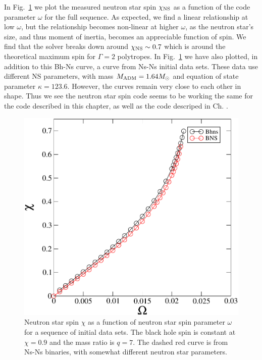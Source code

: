 In Fig.~\ref{fig:ChiVOmega} we plot the
measured neutron star spin $\chi_{\rm NS}$ as a function of the code
parameter $\omega$ for the full sequence. As expected, we find a linear
relationship at low $\omega$, but the relationship becomes non-linear
at higher $\omega$, as the neutron star's size, and thus moment of
inertia, becomes an appreciable function of spin. We find that the
solver breaks down around $\chi_{\rm NS}\sim 0.7$ which is around the
theoretical maximum spin for $\Gamma=2$ polytropes. In
Fig.~\ref{fig:ChiVOmega} we have also plotted, in addition to this
Bh-Ns curve, a curve from Ns-Ns initial data sets. These data use
different NS parameters, with mass $M_{\rm ADM}=1.64M_{\odot}$ and
equation of state parameter $\kappa=123.6$. However, the curves remain
very close to each other in shape. Thus we see the neutron star spin
code seems to be working the same for the code described in this
chapter, as well as the code descriped in Ch. .

\begin{figure}
\includegraphics[width=0.95\columnwidth]{chap4/chiVOmega}
\caption[$\chi_{\rm NS}$ as a function of $\omega_{\rm NS}$ for bh-ns
binaries]
{\label{fig:ChiVOmega}
Neutron star spin $\chi$ as a function of neutron star spin parameter
$\omega$ for a sequence of initial data sets. The black hole spin is
constant at $\chi=0.9$ and the mass ratio is $q=7$. The dashed red curve is
from Ns-Ns binaries, with somewhat different neutron star parameters.}
\end{figure}

